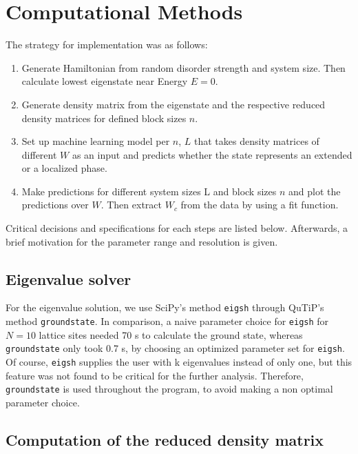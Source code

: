 \documentclass[reprint,amsmath,amssymb,aps,prb]{revtex4-2}
\begin{document}
\section{Computational Methods}

The strategy for implementation was as follows:

\begin{enumerate}
	\item Generate Hamiltonian from random disorder strength and system size. Then calculate lowest eigenstate near Energy $E = 0$.
	\item Generate density matrix from the eigenstate and the respective reduced density matrices for defined block sizes $n$.
	\item  Set up machine learning model per $n$, $L$ that takes density matrices of different $W$ as an input and predicts whether the state represents an extended or a localized phase.
	\item Make predictions for different system sizes L and block sizes $n$ and plot the predictions over $W$. Then extract $W_c$	from the data by using a fit function.
\end{enumerate}

Critical decisions and specifications for each steps are listed below. Afterwards, a brief motivation for the parameter range and resolution is given.

\subsection{Eigenvalue solver}

For the eigenvalue solution, we use SciPy's method \texttt{eigsh} through QuTiP's method \texttt{groundstate}\cite{Virtanen_2020, Johansson2012}. In comparison, a naive parameter choice for \texttt{eigsh} for $N=10$ lattice sites needed 70 s to calculate the ground state, whereas \texttt{groundstate} only took 0.7 s, by choosing an optimized parameter set for \texttt{eigsh}. Of course, \texttt{eigsh} supplies the user with k eigenvalues instead of only one, but this feature was not found to be critical for the further analysis. Therefore, \texttt{groundstate} is used throughout the program, to avoid making a non optimal parameter choice.

\subsection{Computation of the reduced density matrix}
\end{document}
